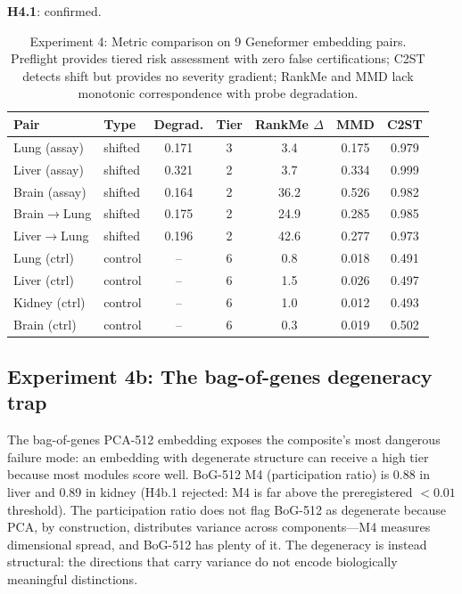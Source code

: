 \documentclass[11pt,letterpaper]{article}
\begin{document}
\textbf{H4.1}: confirmed.

\begin{table}[t]
\centering
\caption{Experiment 4: Metric comparison on 9 Geneformer embedding pairs. Preflight provides tiered risk assessment with zero false certifications; C2ST detects shift but provides no severity gradient; RankMe and MMD lack monotonic correspondence with probe degradation.}
\label{tab:exp4}
\small
\begin{tabular}{@{}llccccc@{}}
\toprule
Pair & Type & Degrad. & Tier & RankMe $\Delta$ & MMD & C2ST \\
\midrule
Lung (assay)  & shifted & 0.171 & 3 & 3.4  & 0.175 & 0.979 \\
Liver (assay) & shifted & 0.321 & 2 & 3.7  & 0.334 & 0.999 \\
Brain (assay) & shifted & 0.164 & 2 & 36.2 & 0.526 & 0.982 \\
Brain$\to$Lung  & shifted & 0.175 & 2 & 24.9 & 0.285 & 0.985 \\
Liver$\to$Lung  & shifted & 0.196 & 2 & 42.6 & 0.277 & 0.973 \\
\midrule
Lung (ctrl)   & control & -- & 6 & 0.8 & 0.018 & 0.491 \\
Liver (ctrl)  & control & -- & 6 & 1.5 & 0.026 & 0.497 \\
Kidney (ctrl) & control & -- & 6 & 1.0 & 0.012 & 0.493 \\
Brain (ctrl)  & control & -- & 6 & 0.3 & 0.019 & 0.502 \\
\bottomrule
\end{tabular}
\end{table}

\subsection{Experiment 4b: The bag-of-genes degeneracy trap}

The bag-of-genes PCA-512 embedding exposes the composite's most dangerous failure mode: an embedding with degenerate structure can receive a high tier because most modules score well. BoG-512 M4 (participation ratio) is 0.88 in liver and 0.89 in kidney (H4b.1 rejected: M4 is far above the preregistered $< 0.01$ threshold). The participation ratio does not flag BoG-512 as degenerate because PCA, by construction, distributes variance across components---M4 measures dimensional spread, and BoG-512 has plenty of it. The degeneracy is instead structural: the directions that carry variance do not encode biologically meaningful distinctions.
\end{document}
